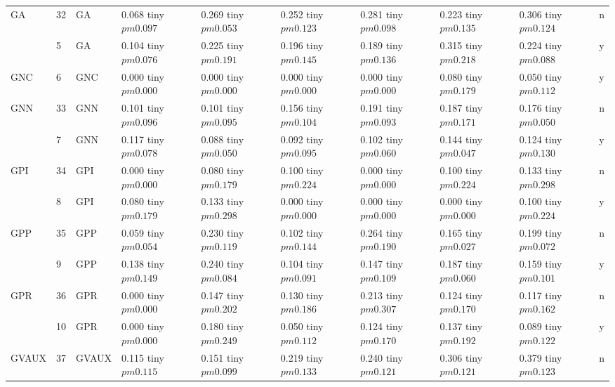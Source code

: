 \begin{table}
\begin{tabular}{llllllllll}
\cline{1-10}
\multirow[t]{2}{*}{GA} & 32 & GA & 0.068 tiny $ pm 0.097$ & 0.269 tiny $ pm 0.053$ & 0.252 tiny $ pm 0.123$ & 0.281 tiny $ pm 0.098$ & 0.223 tiny $ pm 0.135$ & 0.306 tiny $ pm 0.124$ & n \\
 & 5 & GA & 0.104 tiny $ pm 0.076$ & 0.225 tiny $ pm 0.191$ & 0.196 tiny $ pm 0.145$ & 0.189 tiny $ pm 0.136$ & 0.315 tiny $ pm 0.218$ & 0.224 tiny $ pm 0.088$ & y \\
\cline{1-10}
GNC & 6 & GNC & 0.000 tiny $ pm 0.000$ & 0.000 tiny $ pm 0.000$ & 0.000 tiny $ pm 0.000$ & 0.000 tiny $ pm 0.000$ & 0.080 tiny $ pm 0.179$ & 0.050 tiny $ pm 0.112$ & y \\
\cline{1-10}
\multirow[t]{2}{*}{GNN} & 33 & GNN & 0.101 tiny $ pm 0.096$ & 0.101 tiny $ pm 0.095$ & 0.156 tiny $ pm 0.104$ & 0.191 tiny $ pm 0.093$ & 0.187 tiny $ pm 0.171$ & 0.176 tiny $ pm 0.050$ & n \\
 & 7 & GNN & 0.117 tiny $ pm 0.078$ & 0.088 tiny $ pm 0.050$ & 0.092 tiny $ pm 0.095$ & 0.102 tiny $ pm 0.060$ & 0.144 tiny $ pm 0.047$ & 0.124 tiny $ pm 0.130$ & y \\
\cline{1-10}
\multirow[t]{2}{*}{GPI} & 34 & GPI & 0.000 tiny $ pm 0.000$ & 0.080 tiny $ pm 0.179$ & 0.100 tiny $ pm 0.224$ & 0.000 tiny $ pm 0.000$ & 0.100 tiny $ pm 0.224$ & 0.133 tiny $ pm 0.298$ & n \\
 & 8 & GPI & 0.080 tiny $ pm 0.179$ & 0.133 tiny $ pm 0.298$ & 0.000 tiny $ pm 0.000$ & 0.000 tiny $ pm 0.000$ & 0.000 tiny $ pm 0.000$ & 0.100 tiny $ pm 0.224$ & y \\
\cline{1-10}
\multirow[t]{2}{*}{GPP} & 35 & GPP & 0.059 tiny $ pm 0.054$ & 0.230 tiny $ pm 0.119$ & 0.102 tiny $ pm 0.144$ & 0.264 tiny $ pm 0.190$ & 0.165 tiny $ pm 0.027$ & 0.199 tiny $ pm 0.072$ & n \\
 & 9 & GPP & 0.138 tiny $ pm 0.149$ & 0.240 tiny $ pm 0.084$ & 0.104 tiny $ pm 0.091$ & 0.147 tiny $ pm 0.109$ & 0.187 tiny $ pm 0.060$ & 0.159 tiny $ pm 0.101$ & y \\
\cline{1-10}
\multirow[t]{2}{*}{GPR} & 36 & GPR & 0.000 tiny $ pm 0.000$ & 0.147 tiny $ pm 0.202$ & 0.130 tiny $ pm 0.186$ & 0.213 tiny $ pm 0.307$ & 0.124 tiny $ pm 0.170$ & 0.117 tiny $ pm 0.162$ & n \\
 & 10 & GPR & 0.000 tiny $ pm 0.000$ & 0.180 tiny $ pm 0.249$ & 0.050 tiny $ pm 0.112$ & 0.124 tiny $ pm 0.170$ & 0.137 tiny $ pm 0.192$ & 0.089 tiny $ pm 0.122$ & y \\
\cline{1-10}
\multirow[t]{2}{*}{GVAUX} & 37 & GVAUX & 0.115 tiny $ pm 0.115$ & 0.151 tiny $ pm 0.099$ & 0.219 tiny $ pm 0.133$ & 0.240 tiny $ pm 0.121$ & 0.306 tiny $ pm 0.121$ & 0.379 tiny $ pm 0.123$ & n \\

\end{tabular}
\end{table}

